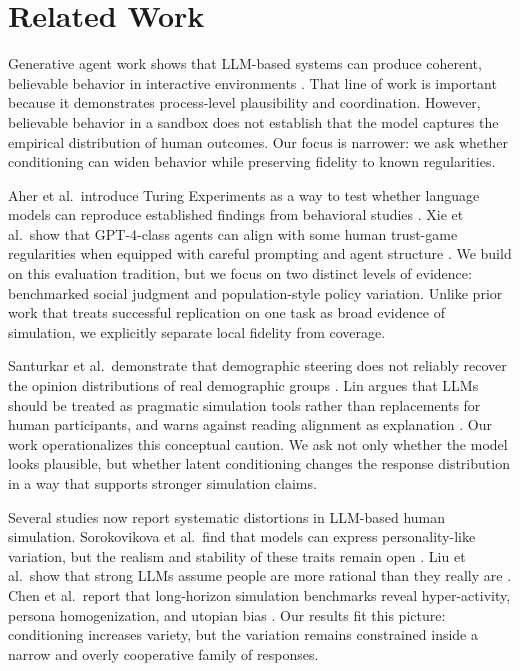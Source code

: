 \section{Related Work}
\label{sec:related_work}

 Generative agent work shows that LLM-based systems can produce coherent, believable behavior in interactive environments \cite{park2023generative}. That line of work is important because it demonstrates process-level plausibility and coordination. However, believable behavior in a sandbox does not establish that the model captures the empirical distribution of human outcomes. Our focus is narrower: we ask whether conditioning can widen behavior while preserving fidelity to known regularities.

 Aher et al.\ introduce Turing Experiments as a way to test whether language models can reproduce established findings from behavioral studies \cite{aher2023using}. Xie et al.\ show that GPT-4-class agents can align with some human trust-game regularities when equipped with careful prompting and agent structure \cite{xie2024trust}. We build on this evaluation tradition, but we focus on two distinct levels of evidence: benchmarked social judgment and population-style policy variation. Unlike prior work that treats successful replication on one task as broad evidence of simulation, we explicitly separate local fidelity from coverage.

 Santurkar et al.\ demonstrate that demographic steering does not reliably recover the opinion distributions of real demographic groups \cite{santurkar2023opinions}. Lin argues that LLMs should be treated as pragmatic simulation tools rather than replacements for human participants, and warns against reading alignment as explanation \cite{lin2025fallacies}. Our work operationalizes this conceptual caution. We ask not only whether the model looks plausible, but whether latent conditioning changes the response distribution in a way that supports stronger simulation claims.

 Several studies now report systematic distortions in LLM-based human simulation. Sorokovikova et al.\ find that models can express personality-like variation, but the realism and stability of these traits remain open \cite{sorokovikova2024bigfive}. Liu et al.\ show that strong LLMs assume people are more rational than they really are \cite{liu2025rational}. Chen et al.\ report that long-horizon simulation benchmarks reveal hyper-activity, persona homogenization, and utopian bias \cite{chen2026omnibehavior}. Our results fit this picture: conditioning increases variety, but the variation remains constrained inside a narrow and overly cooperative family of responses.
